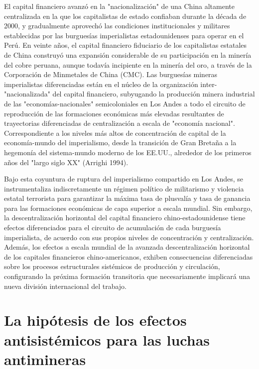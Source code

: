 \documentclass[]{interact}
\theoremstyle{plain}%
\theoremstyle{definition}
\theoremstyle{remark}
\begin{document}
El capital financiero avanzó en la "nacionalización" de una China altamente centralizada en la que los capitalistas de estado confiaban durante la década de 2000, y gradualmente aprovechó las condiciones institucionales y militares establecidas por las burguesías imperialistas estadounidenses para operar en el Perú. En veinte años, el capital financiero fiduciario de los capitalistas estatales de China construyó una expansión considerable de su participación en la minería del cobre peruana, aunque todavía incipiente en la minería del oro, a través de la Corporación de Minmetales de China (CMC). Las burguesías mineras imperialistas diferenciadas están en el núcleo de la organización inter-"nacionalizada" del capital financiero, subyugando la producción minera industrial de las "economías-nacionales" semicoloniales en Los Andes a todo el circuito de reproducción de las formaciones económicas más elevadas resultantes de trayectorias diferenciadas de centralización a escala de "economía nacional". Correspondiente a los niveles más altos de concentración de capital de la economía-mundo del imperialismo, desde la transición de Gran Bretaña a la hegemonía del sistema-mundo moderno de los EE.UU., alrededor de los primeros años del "largo siglo XX" (Arrighi 1994). 

Bajo esta coyuntura de ruptura del imperialismo compartido en Los Andes, se instrumentaliza indiscretamente un régimen político de militarismo y violencia estatal terrorista para garantizar la máxima tasa de plusvalía y tasa de ganancia para las formaciones económicas de capa superior a escala mundial. Sin embargo, la descentralización horizontal del capital financiero chino-estadounidense tiene efectos diferenciados para el circuito de acumulación de cada burguesía imperialista, de acuerdo con sus propios niveles de concentración y centralización. Además, los efectos a escala mundial de la avanzada descentralización horizontal de los capitales financieros chino-americanos, exhiben consecuencias diferenciadas sobre los procesos estructurales sistémicos de producción y circulación, configurando la próxima formación transitoria que necesariamente implicará una nueva división internacional del trabajo.

\section{La hipótesis de los efectos antisistémicos para las luchas antimineras}
\end{document}
